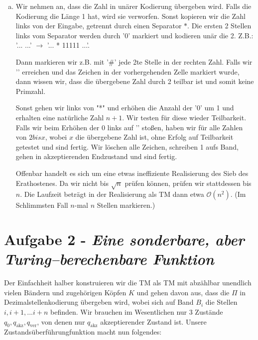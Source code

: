 \documentclass{article}
\begin{document}
\begin{enumerate}[a)]
	\item Wir nehmen an, dass die Zahl in unärer Kodierung übergeben wird. Falls die Kodierung die Länge 1 hat, wird sie verworfen. Sonst kopieren wir die Zahl links von der Eingabe, getrennt durch einen Separator $*$. Die ersten 2 Stellen links vom Separator werden durch '0' markiert und kodieren unär die 2. Z.B.: '...  \textvisiblespace...' $\to$ '...  11111 \textvisiblespace...'.
	
	Dann markieren wir z.B. mit '\#' jede 2te Stelle in der rechten Zahl. Falls wir '\textvisiblespace' erreichen und das Zeichen in der vorhergehenden Zelle markiert wurde, dann wissen wir, dass die übergebene Zahl durch 2 teilbar ist und somit keine Primzahl.
	
	Sonst gehen wir links von "*" und erhöhen die Anzahl der '0' um 1 und erhalten eine natürliche Zahl $n+1$. Wir testen für diese wieder Teilbarkeit. Falls wir beim Erhöhen der 0 links auf '\textvisiblespace' stoßen, haben wir für alle Zahlen von $2 bis x$, wobei $x$ die übergebene Zahl ist, ohne Erfolg auf Teilbarkeit getestet und sind fertig. Wir löschen alle Zeichen, schreiben 1 aufs Band, gehen in akzeptierenden Endzustand und sind fertig.
	
	Offenbar handelt es sich um eine etwas ineffiziente Realisierung des Sieb des Erathostenes. Da wir nicht bis $\sqrt{n}$ prüfen können, prüfen wir stattdessen bis $n$. Die Laufzeit beträgt in der Realisierung als TM dann etwa $\mathcal{O}(n^2)$. (Im Schlimmsten Fall $n$-mal $n$ Stellen markieren.)
\end{enumerate}


\section*{Aufgabe 2 - \textit{Eine sonderbare, aber Turing–berechenbare Funktion}}

Der Einfachheit halber konstruieren wir die TM als TM mit abzählbar unendlich vielen Bändern und zugehörigen Köpfen $K$ und gehen davon aus, dass die $\Pi$ in Dezimalstellenkodierung übergeben wird, wobei sich auf Band $B_i$ die Stellen $ i, i+1, ... i+n$ befinden. Wir brauchen im Wesentlichen nur 3 Zustände $q_0, q_\text{akz}, q_\text{ver}$, von denen nur $q_\text{akz}$ akzeptierender Zustand ist. Unsere Zustandsüberführungfunktion macht nun folgendes:
\end{document}
